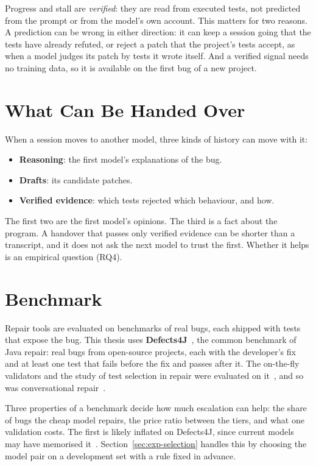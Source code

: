 Progress and stall are \emph{verified}: they are read from executed tests, not
predicted from the prompt or from the model's own account. This matters for
two reasons. A prediction can be wrong in either direction: it can keep a
session going that the tests have already refuted, or reject a patch that the
project's tests accept, as when a model judges its patch by tests it wrote
itself. And a verified signal needs no training data, so it is available on
the first bug of a new project.

\section{What Can Be Handed Over}
\label{sec:bg-handover}

When a session moves to another model, three kinds of history can move with
it:
\begin{itemize}
\item \textbf{Reasoning}: the first model's explanations of the bug.
\item \textbf{Drafts}: its candidate patches.
\item \textbf{Verified evidence}: which tests rejected which behaviour, and
how.
\end{itemize}
The first two are the first model's opinions. The third is a fact about the
program. A handover that passes only verified evidence can be shorter than a
transcript, and it does not ask the next model to trust the first. Whether it
helps is an empirical question (RQ4).

\section{Benchmark}
\label{sec:bg-benchmarks}

Repair tools are evaluated on benchmarks of real bugs, each shipped with tests
that expose the bug. This thesis uses \textbf{Defects4J}~\citep{just2014defects4j},
the common benchmark of Java repair: real bugs from open-source projects, each
with the developer's fix and at least one test that fails before the fix and
passes after it. The on-the-fly validators and the study of test selection in
repair were evaluated on
it~\citep{chen2021uniapr,xiao2024expressapr,lou2024aprregression}, and so was
conversational repair~\citep{xia2024chatrepair}.

Three properties of a benchmark decide how much escalation can help: the share
of bugs the cheap model repairs, the price ratio between the tiers, and what
one validation costs. The first is likely inflated on Defects4J, since current
models may have memorised it~\citep{ramos2024memorizing}.
Section~\ref{sec:exp-selection} handles this by choosing the model pair on a
development set with a rule fixed in advance.
